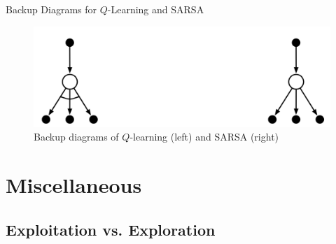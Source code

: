 \begin{frame}{Backup Diagrams for $Q$-Learning and SARSA}{}
	\begin{figure}
		\centering
		\includegraphics[scale=0.35]{14_rl/02_img/backup_diagram_q_learning_sarsa}
		\caption{Backup diagrams of $Q$-learning (left) and SARSA (right)}
	\end{figure}
\end{frame}


\section{Miscellaneous}

\subsection{Exploitation vs. Exploration}

